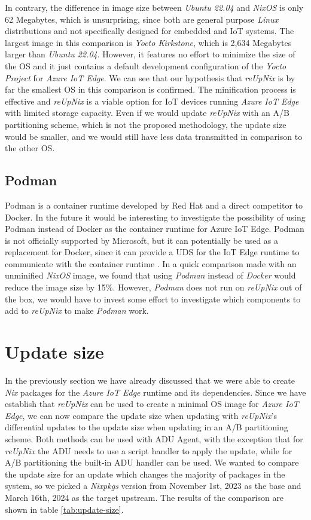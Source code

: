 \noindent
In contrary, the difference in image size between \textit{Ubuntu 22.04} and
\textit{NixOS} is only 62 Megabytes, which is unsurprising, since both are
general purpose \textit{Linux} distributions and not specifically designed
for embedded and \ac{IoT} systems. The largest image in this comparison is
\textit{Yocto Kirkstone}, which is 2,634 Megabytes larger than \textit{Ubuntu 22.04}.
However, it features no effort to minimize the size of the \ac{OS} and it
just contains a default development configuration of the \textit{Yocto Project}
for \textit{Azure IoT Edge}. We can see that our hypothesis that \textit{reUpNix}
is by far the smallest \ac{OS} in this comparison is confirmed. The minification
process is effective and \textit{reUpNix} is a viable option for \ac{IoT} devices
running \textit{Azure IoT Edge} with limited storage capacity. Even if we would
update \textit{reUpNix} with an A/B partitioning scheme, which is not the proposed
methodology, the update size would be smaller, and we would still have less data
transmitted in comparison to the other \ac{OS}.

\subsection{Podman}
Podman is a container runtime developed by Red Hat and a direct competitor to Docker.
In the future it would be interesting to investigate the possibility of using
Podman instead of Docker as the container runtime for Azure IoT Edge. Podman is
not officially supported by Microsoft, but it can potentially be used as a
replacement for Docker, since it can provide a \ac{UDS} for the IoT Edge runtime
to communicate with the container runtime \cite{book:3556946,msdoc-supportetplatforms}.
In a quick comparison made with an unminified \textit{NixOS} image, we found that
using \textit{Podman} instead of \textit{Docker} would reduce the image size by
15\%. However, \textit{Podman} does not run on \textit{reUpNix} out of the box,
we would have to invest some effort to investigate which components to add to
\textit{reUpNix} to make \textit{Podman} work.

\section{Update size}
In the previously section we have already discussed that we were able to create
\textit{Nix} packages for the \textit{Azure IoT Edge} runtime and its dependencies.
Since we have establish that \textit{reUpNix} can be used to create a minimal
\ac{OS} image for \textit{Azure IoT Edge}, we can now compare the update size
when updating with \textit{reUpNix}'s differential updates to the update size
when updating in an A/B partitioning scheme. Both methods can be used
with \ac{ADU} Agent, with the exception that for \textit{reUpNix} the \ac{ADU}
needs to use a script handler to apply the update, while for A/B partitioning
the built-in \ac{ADU} handler can be used. We wanted to compare the update size
for an update which changes the majority of packages in the system, so we
picked a \textit{Nixpkgs} version from November 1st, 2023 as the base and March 16th,
2024 as the target upstream. The results of the comparison are shown in table
\ref{tab:update-size}.

